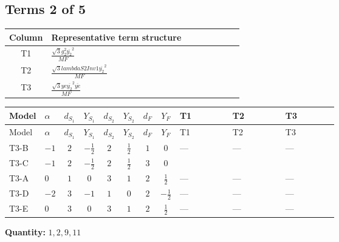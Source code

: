 \documentclass[8pt]{article}
\begin{document}
\begin{landscape}
\subsection*{Terms 2 of 5}
\begin{center}
\begin{tabular}{@{}c >{\raggedright\arraybackslash}p{0.82\linewidth}@{}}
\toprule
Column & Representative term structure \\
\midrule
T1 & \(\displaystyle \frac{\sqrt{3} g_{2}^{2} \overline{y_{2}}^{2}}{MF}\) \\
\midrule
T2 & \(\displaystyle \frac{\sqrt{3} lambdaS2Inv1 \overline{y_{2}}^{2}}{MF}\) \\
\midrule
T3 & \(\displaystyle \frac{\sqrt{3} ye \overline{y_{2}}^{2} \overline{ye}}{MF}\) \\
\midrule
\bottomrule
\end{tabular}
\end{center}
\smallskip
\tiny
\begin{longtable}{@{}llcccccc >{\raggedright\arraybackslash}p{0.21\linewidth} >{\raggedright\arraybackslash}p{0.21\linewidth} >{\raggedright\arraybackslash}p{0.21\linewidth}@{}}
\toprule
Model & $\alpha$ & $d_{S_1}$ & $Y_{S_1}$ & $d_{S_2}$ & $Y_{S_2}$ & $d_F$ & $Y_F$ & T1 & T2 & T3 \\
\midrule
\endfirsthead
\toprule
Model & $\alpha$ & $d_{S_1}$ & $Y_{S_1}$ & $d_{S_2}$ & $Y_{S_2}$ & $d_F$ & $Y_F$ & T1 & T2 & T3 \\
\midrule
\endhead
T3-B & $-1$ & $2$ & $-\frac{1}{2}$ & $2$ & $\frac{1}{2}$ & $1$ & $0$ & --- & --- & --- \\
\midrule
T3-C & $-1$ & $2$ & $-\frac{1}{2}$ & $2$ & $\frac{1}{2}$ & $3$ & $0$ & \scriptsize\adjustbox{max width=\linewidth}{$\begin{gathered} \frac{\sqrt{3} g_{2}^{2} \overline{y_{2}}^{2}}{8 MF}\end{gathered}$} & \scriptsize\adjustbox{max width=\linewidth}{$\begin{gathered} \frac{\sqrt{3} lambdaS2Inv1 \overline{y_{2}}^{2}}{12 MF}\end{gathered}$} & \scriptsize\adjustbox{max width=\linewidth}{$\begin{gathered} - \frac{\sqrt{3} ye \overline{y_{2}}^{2} \overline{ye}}{24 MF}\end{gathered}$} \\
\midrule
T3-A & $0$ & $1$ & $0$ & $3$ & $1$ & $2$ & $\frac{1}{2}$ & --- & --- & --- \\
\midrule
T3-D & $-2$ & $3$ & $-1$ & $1$ & $0$ & $2$ & $-\frac{1}{2}$ & --- & --- & --- \\
\midrule
T3-E & $0$ & $3$ & $0$ & $3$ & $1$ & $2$ & $\frac{1}{2}$ & --- & --- & --- \\
\midrule
\bottomrule
\end{longtable}
\clearpage
\noindent\textbf{Quantity: }$\mathrm{1,2,9,11}$\par\smallskip

\end{landscape}
\end{document}

